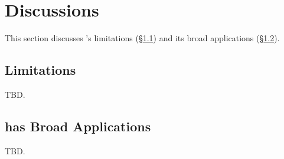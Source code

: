 \section{Discussions}\label{sec:discuss}

This section discusses \xxx's limitations (\S\ref{sec:limits}) and its broad 
applications (\S\ref{sec:apps}).

\subsection{Limitations}\label{sec:limits}

TBD.






\subsection{\xxx has Broad Applications}\label{sec:apps}

TBD.
